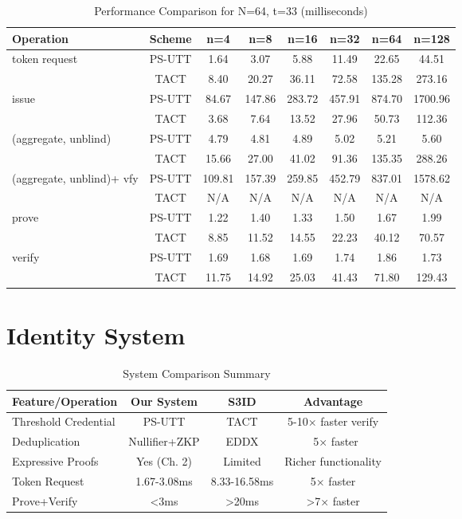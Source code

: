 \begin{table}[htbp]
\centering
\caption{Performance Comparison for N=64, t=33 (milliseconds)}
\begin{tabular}{lccccccc}
\toprule
\textbf{Operation} & \textbf{Scheme} & \textbf{n=4} & \textbf{n=8} & \textbf{n=16} & \textbf{n=32} & \textbf{n=64} & \textbf{n=128} \\
\midrule
token request & PS-UTT & 1.64 & 3.07 & 5.88 & 11.49 & 22.65 & 44.51 \\
 & TACT & 8.40 & 20.27 & 36.11 & 72.58 & 135.28 & 273.16 \\
\midrule
issue & PS-UTT & 84.67 & 147.86 & 283.72 & 457.91 & 874.70 & 1700.96 \\
 & TACT & 3.68 & 7.64 & 13.52 & 27.96 & 50.73 & 112.36 \\
\midrule
(aggregate, unblind) & PS-UTT & 4.79 & 4.81 & 4.89 & 5.02 & 5.21 & 5.60 \\
 & TACT & 15.66 & 27.00 & 41.02 & 91.36 & 135.35 & 288.26 \\
\midrule
(aggregate, unblind)+ vfy & PS-UTT & 109.81 & 157.39 & 259.85 & 452.79 & 837.01 & 1578.62 \\
 & TACT & N/A & N/A & N/A & N/A & N/A & N/A \\
\midrule
prove & PS-UTT & 1.22 & 1.40 & 1.33 & 1.50 & 1.67 & 1.99 \\
 & TACT & 8.85 & 11.52 & 14.55 & 22.23 & 40.12 & 70.57 \\
\midrule
verify & PS-UTT & 1.69 & 1.68 & 1.69 & 1.74 & 1.86 & 1.73 \\
 & TACT & 11.75 & 14.92 & 25.03 & 41.43 & 71.80 & 129.43 \\
\bottomrule
\end{tabular}
\label{tab:perf-comp-64-33}
\end{table}




\section{Identity System}

\begin{table}[h]
\centering
\caption{System Comparison Summary}
\begin{tabular}{lccc}
\toprule
\textbf{Feature/Operation} & \textbf{Our System} & \textbf{S3ID} & \textbf{Advantage} \\
\midrule
Threshold Credential & PS-UTT & TACT & 5-10× faster verify \\
Deduplication & Nullifier+ZKP & EDDX & ~5× faster \\
Expressive Proofs & Yes (Ch. 2) & Limited & Richer functionality \\
Token Request & 1.67-3.08ms & 8.33-16.58ms & 5× faster \\
Prove+Verify & <3ms & >20ms & >7× faster \\
\bottomrule
\end{tabular}
\end{table}

